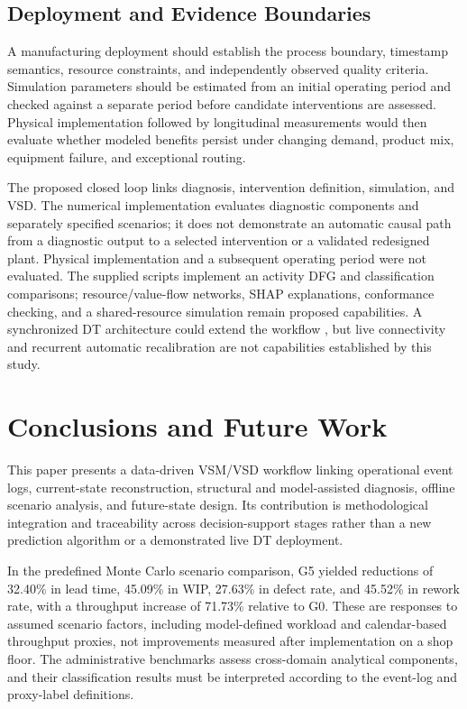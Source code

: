 \documentclass[pdflatex,iicol,Numbered,sn-basic]{sn-jnl}
\begin{document}
\subsection{Deployment and Evidence Boundaries}

A manufacturing deployment should establish the process boundary, timestamp semantics, resource constraints, and independently observed quality criteria. Simulation parameters should be estimated from an initial operating period and checked against a separate period before candidate interventions are assessed. Physical implementation followed by longitudinal measurements would then evaluate whether modeled benefits persist under changing demand, product mix, equipment failure, and exceptional routing.

The proposed closed loop links diagnosis, intervention definition, simulation, and VSD. The numerical implementation evaluates diagnostic components and separately specified scenarios; it does not demonstrate an automatic causal path from a diagnostic output to a selected intervention or a validated redesigned plant. Physical implementation and a subsequent operating period were not evaluated. The supplied scripts implement an activity DFG and classification comparisons; resource/value-flow networks, SHAP explanations, conformance checking, and a shared-resource simulation remain proposed capabilities. A synchronized DT architecture could extend the workflow \cite{GrievesVickers2017,Aheleroff2021DTaaS}, but live connectivity and recurrent automatic recalibration are not capabilities established by this study.

\section{Conclusions and Future Work}
\label{sec:conclusions}

This paper presents a data-driven VSM/VSD workflow linking operational event logs, current-state reconstruction, structural and model-assisted diagnosis, offline scenario analysis, and future-state design. Its contribution is methodological integration and traceability across decision-support stages rather than a new prediction algorithm or a demonstrated live DT deployment.

In the predefined Monte Carlo scenario comparison, G5 yielded reductions of 32.40\% in lead time, 45.09\% in WIP, 27.63\% in defect rate, and 45.52\% in rework rate, with a throughput increase of 71.73\% relative to G0. These are responses to assumed scenario factors, including model-defined workload and calendar-based throughput proxies, not improvements measured after implementation on a shop floor. The administrative benchmarks assess cross-domain analytical components, and their classification results must be interpreted according to the event-log and proxy-label definitions.
\end{document}
